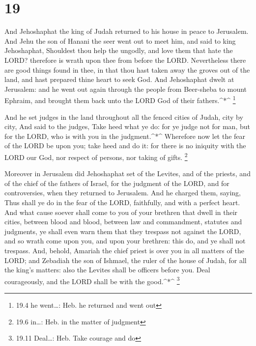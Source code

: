 \hypertarget{section-18}{%
\section{19}\label{section-18}}

 And Jehoshaphat the king of Judah returned to his house in
peace to Jerusalem.  And Jehu the son of Hanani the seer
went out to meet him, and said to king Jehoshaphat, Shouldest thou help
the ungodly, and love them that hate the LORD? therefore is wrath upon
thee from before the LORD.  Nevertheless there are good
things found in thee, in that thou hast taken away the groves out of the
land, and hast prepared thine heart to seek God.  And
Jehoshaphat dwelt at Jerusalem: and he went out again through the people
from Beer-sheba to mount Ephraim, and brought them back unto the LORD
God of their fathers.\^{}*\^{} \footnote{19.4 he went\ldots: Heb. he
  returned and went out}

 And he set judges in the land throughout all the fenced
cities of Judah, city by city,  And said to the judges, Take
heed what ye do: for ye judge not for man, but for the LORD, who is with
you in the judgment.\^{}*\^{}  Wherefore now let the fear of
the LORD be upon you; take heed and do it: for there is no iniquity with
the LORD our God, nor respect of persons, nor taking of gifts.
\footnote{19.6 in\ldots: Heb. in the matter of judgment}

 Moreover in Jerusalem did Jehoshaphat set of the Levites,
and of the priests, and of the chief of the fathers of Israel, for the
judgment of the LORD, and for controversies, when they returned to
Jerusalem.  And he charged them, saying, Thus shall ye do in
the fear of the LORD, faithfully, and with a perfect heart.
 And what cause soever shall come to you of your brethren
that dwell in their cities, between blood and blood, between law and
commandment, statutes and judgments, ye shall even warn them that they
trespass not against the LORD, and so wrath come upon you, and upon your
brethren: this do, and ye shall not trespass.  And, behold,
Amariah the chief priest is over you in all matters of the LORD; and
Zebadiah the son of Ishmael, the ruler of the house of Judah, for all
the king's matters: also the Levites shall be officers before you. Deal
courageously, and the LORD shall be with the good.\^{}*\^{} \footnote{19.11
  Deal\ldots: Heb. Take courage and do}

